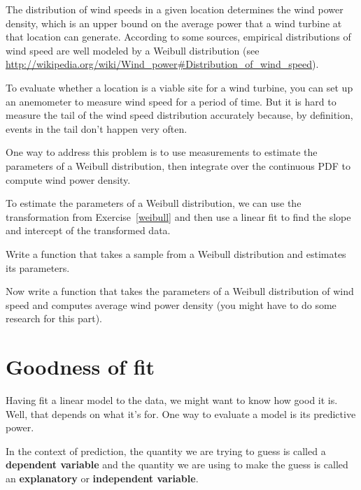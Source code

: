 \documentclass[12pt]{book}
\begin{document}
\begin{exercise}
The distribution of wind speeds in a given location determines the
wind power density, which is an upper bound on the average power that
a wind turbine at that location can generate.  According to some
sources, empirical distributions of wind speed are well modeled by a
Weibull distribution (see
\url{http://wikipedia.org/wiki/Wind_power#Distribution_of_wind_speed}).

To evaluate whether a location is a viable site for a wind turbine,
you can set up an anemometer to measure wind speed for a period of
time.  But it is hard to measure the tail of the wind speed distribution
accurately because, by definition, events in the tail don't happen
very often.

One way to address this problem is to use measurements to estimate the
parameters of a Weibull distribution, then integrate over the
continuous PDF to compute wind power density.

To estimate the parameters of a Weibull distribution, we can use the
transformation from Exercise~\ref{weibull} and then use a linear fit
to find the slope and intercept of the transformed data.

Write a function that takes a sample from a Weibull distribution and
estimates its parameters.

Now write a function that takes the parameters of a Weibull distribution
of wind speed and computes average wind power density (you might have
to do some research for this part).

\end{exercise}


\section{Goodness of fit}

Having fit a linear model to the data, we might want to know how good
it is.  Well, that depends on what it's for.  One way to evaluate a
model is its predictive power.

In the context of prediction, the quantity we are trying to guess is
called a {\bf dependent variable} and the quantity we are using to
make the guess is called an {\bf explanatory} or {\bf independent
  variable}.
\end{document}
